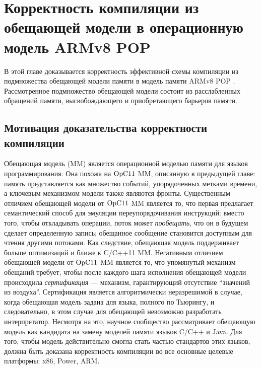 \chapter{Корректность компиляции из обещающей модели в операционную модель ARMv8 POP}
\label{sec:armpop}

В этой главе %
доказывается корректность эффективной схемы компиляции из
подмножества обещающей модели памяти \cite{Kang-al:POPL17} в модель памяти ARMv8 POP \cite{Flur-al:POPL16}.
Рассмотренное подмножество обещающей модели состоит из расслабленных обращений памяти,
высвобождающего и приобретающего барьеров памяти.


\section{Мотивация доказательства корректности компиляции}
\label{sec:armpop:motive}
Обещающая модель (\Promise MM)\label{acr:promise} является операционной моделью памяти для языков программирования.
Она похожа на $\mathrm{OpC11}$ MM, описанную в предыдущей главе: память представляется как множество событий,
упорядоченных метками времени, а ключевым механизмом модели также являются фронты.
Существенным отличием обещающей модели от $\mathrm{OpC11}$ MM является то, что первая предлагает семантический
способ для эмуляции переупорядочивания инструкций:
вместо того, чтобы откладывать операции, поток может \emph{пообещать}, что он в будущем сделает определенную запись;
обещанное сообщение становится доступным для чтения другими потоками.
Как следствие, обещающая модель поддерживает больше оптимизаций и ближе к C/C++11 MM.
Негативным отличием обещающей модели от $\mathrm{OpC11}$ MM является то, что упомянутый механизм обещаний требует, чтобы
после каждого шага исполнения обещающей модели происходила \emph{сертификация} --- механизм, гарантирующий
отсутствие ``значений из воздуха''. Сертификация является алгоритмически неразрешимой в случае, когда обещающая
модель задана для языка, полного по Тьюрингу, и следовательно, в этом случае для обещающей невозможно
разработать интерпретатор.
Несмотря на это, научное сообщество рассматривает обещающую модель как кандидата на замену моделей памяти языков C/C++ и Java.
Для того, чтобы модель действительно смогла стать частью стандартов этих языков, должна быть доказана корректность
компиляции во все основные целевые платформы: x86, Power, ARM.

